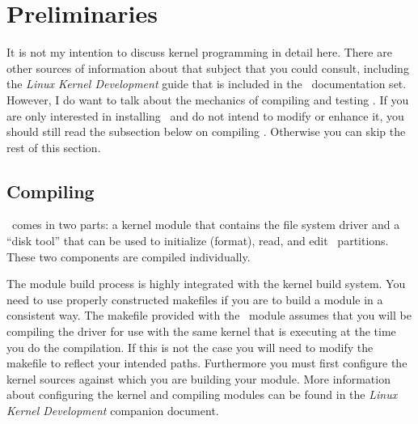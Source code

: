 %
%
%
%

\section{Preliminaries}
\label{sec:preliminaries}

It is not my intention to discuss kernel programming in detail here. There are other sources of
information about that subject that you could consult, including the \textit{Linux Kernel
  Development} guide that is included in the \GenericFS\ documentation set. However, I do want
to talk about the mechanics of compiling and testing \GenericFS. If you are only interested in
installing \GenericFS\ and do not intend to modify or enhance it, you should still read the
subsection below on compiling \GenericFS. Otherwise you can skip the rest of this section.

\subsection{Compiling \GenericFS}
\label{sec:compiling}

\GenericFS\ comes in two parts: a kernel module that contains the file system driver and a
``disk tool'' that can be used to initialize (format), read, and edit \GenericFS\ partitions.
These two components are compiled individually.

The module build process is highly integrated with the kernel build system. You need to use
properly constructed makefiles if you are to build a module in a consistent way. The makefile
provided with the \GenericFS\ module assumes that you will be compiling the driver for use with
the same kernel that is executing at the time you do the compilation. If this is not the case
you will need to modify the makefile to reflect your intended paths. Furthermore you must first
configure the kernel sources against which you are building your module. More information about
configuring the kernel and compiling modules can be found in the \textit{Linux Kernel
  Development} companion document.

